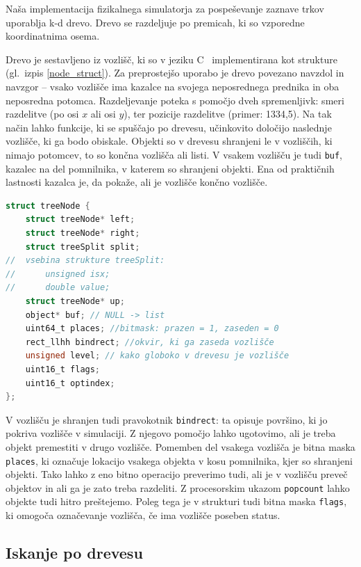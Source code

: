 \documentclass[a4paper,12pt]{article}
\begin{document}
Naša implementacija fizikalnega simulatorja za pospeševanje zaznave trkov uporablja k-d drevo.
Drevo se razdeljuje po premicah, ki so vzporedne koordinatnima osema.

Drevo je sestavljeno iz vozlišč, ki so v jeziku C~\cite{gustedt_modern_2024} implementirana kot strukture (gl.\ izpis \ref{node_struct}).
Za preprostejšo uporabo je drevo povezano navz\-dol in navzgor -- vsako vozlišče ima kazalce na svojega
neposrednega prednika in oba neposredna potomca.
Razdeljevanje poteka s pomočjo dveh spremenljivk: smeri razdelitve (po osi $x$ ali osi $y$), ter
pozicije razdelitve (primer: 1334,5). Na tak način lahko funkcije, ki se spuščajo po drevesu,
učinkovito določijo naslednje vozlišče, ki ga bodo obiskale. Objekti so v
drevesu shranjeni le v vozliščih, ki nimajo potomcev, to so končna vozlišča ali listi.
V vsakem vozlišču je tudi \lstinline|buf|, kazalec na del pomnilnika, v katerem so shranjeni objekti.
Ena od praktičnih lastnosti kazalca je, da pokaže, ali je vozlišče končno vozlišče.

\begin{lstlisting}[caption={Struktura vozlišča}, label=node_struct, language=C]
struct treeNode {
    struct treeNode* left;
    struct treeNode* right;
    struct treeSplit split;
//  vsebina strukture treeSplit:
//      unsigned isx;
//      double value;
    struct treeNode* up;
    object* buf; // NULL -> list
    uint64_t places; //bitmask: prazen = 1, zaseden = 0
    rect_llhh bindrect; //okvir, ki ga zaseda vozlišče
    unsigned level; // kako globoko v drevesu je vozlišče
    uint16_t flags;
    uint16_t optindex;
};
\end{lstlisting}


V vozlišču je shranjen tudi pravokotnik \lstinline|bindrect|: ta opisuje površino, ki jo pokriva vozlišče v simulaciji.
Z njegovo pomočjo lahko ugotovimo, ali je treba objekt premestiti v drugo vozlišče.
Pomemben del vsakega vozlišča je bitna maska \lstinline|places|, ki označuje lokacijo vsakega objekta v kosu
pomnilnika, kjer so shranjeni objekti. Tako lahko z eno bitno operacijo preverimo tudi, ali je v vozlišču
preveč objektov in ali ga je zato treba razdeliti. Z procesorskim ukazom \lstinline|popcount| lahko objekte tudi
hitro preštejemo. Poleg tega je v strukturi tudi bitna maska \lstinline|flags|, ki omogoča označevanje vozlišča,
če ima vozlišče poseben status.

\subsection{Iskanje po drevesu}
\end{document}
